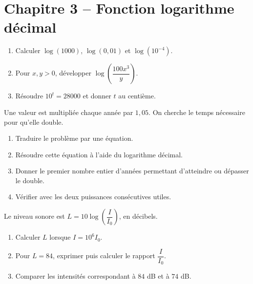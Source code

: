 \section*{Chapitre 3 -- Fonction logarithme décimal}
\begin{exercice}
\begin{enumerate}
\item Calculer $\log(1000)$, $\log(0{,}01)$ et $\log(10^{-4})$.
\item Pour $x,y>0$, développer $\log\!\left(\dfrac{100x^3}{y} \right)$.
\item Résoudre $10^t=28000$ et donner $t$ au centième.
\end{enumerate}
\end{exercice}
\begin{exercice}
Une valeur est multipliée chaque année par $1{,}05$. On cherche le temps nécessaire pour qu'elle double.
\begin{enumerate}
\item Traduire le problème par une équation.
\item Résoudre cette équation à l'aide du logarithme décimal.
\item Donner le premier nombre entier d'années permettant d'atteindre ou dépasser le double.
\item Vérifier avec les deux puissances consécutives utiles.
\end{enumerate}
\end{exercice}
\begin{exercice}
Le niveau sonore est $L=10\log\!\left(\dfrac I{I_0}\right)$, en décibels.
\begin{enumerate}
\item Calculer $L$ lorsque $I=10^6I_0$.
\item Pour $L=84$, exprimer puis calculer le rapport $\dfrac I{I_0}$.
\item Comparer les intensités correspondant à $84$ dB et à $74$ dB.
\end{enumerate}
\end{exercice}

